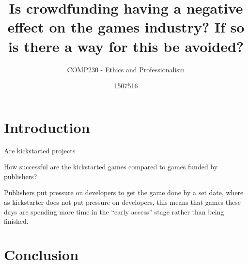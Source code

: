 \documentclass{scrartcl}
\title{Is crowdfunding having a negative effect on the games industry? If so is there a way for this be avoided?}
\subtitle{COMP230 - Ethics and Professionalism}
\author{1507516}
\begin{document}
\maketitle


\section{Introduction}

Are kickstarted projects 

How successful are the kickstarted games compared to games funded by publishers?

Publishers put pressure on developers to get the game done by a set date, where as kickstarter does not put pressure on developers, this means that games these days are spending more time in the ``early access'' stage rather than being finished.



\section{}


\section{Conclusion}




\end{document}
